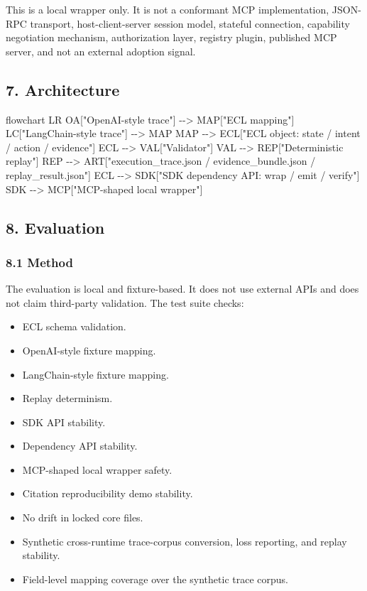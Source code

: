 \documentclass[
]{article}
\newenvironment{Shaded}{}{}
\newcommand{\NormalTok}[1]{#1}
\providecommand{\tightlist}{%
  \setlength{\itemsep}{0pt}\setlength{\parskip}{0pt}}
\begin{document}
This is a local wrapper only. It is not a conformant MCP implementation,
JSON-RPC transport, host-client-server session model, stateful
connection, capability negotiation mechanism, authorization layer,
registry plugin, published MCP server, and not an external adoption
signal.

\subsection{7. Architecture}\label{architecture}

\begin{Shaded}
\begin{Highlighting}[]
\NormalTok{flowchart LR}
\NormalTok{  OA["OpenAI{-}style trace"] {-}{-}\textgreater{} MAP["ECL mapping"]}
\NormalTok{  LC["LangChain{-}style trace"] {-}{-}\textgreater{} MAP}
\NormalTok{  MAP {-}{-}\textgreater{} ECL["ECL object: state / intent / action / evidence"]}
\NormalTok{  ECL {-}{-}\textgreater{} VAL["Validator"]}
\NormalTok{  VAL {-}{-}\textgreater{} REP["Deterministic replay"]}
\NormalTok{  REP {-}{-}\textgreater{} ART["execution\_trace.json / evidence\_bundle.json / replay\_result.json"]}
\NormalTok{  ECL {-}{-}\textgreater{} SDK["SDK dependency API: wrap / emit / verify"]}
\NormalTok{  SDK {-}{-}\textgreater{} MCP["MCP{-}shaped local wrapper"]}
\end{Highlighting}
\end{Shaded}

\subsection{8. Evaluation}\label{evaluation}

\subsubsection{8.1 Method}\label{method}

The evaluation is local and fixture-based. It does not use external APIs
and does not claim third-party validation. The test suite checks:

\begin{itemize}
\tightlist
\item
  ECL schema validation.
\item
  OpenAI-style fixture mapping.
\item
  LangChain-style fixture mapping.
\item
  Replay determinism.
\item
  SDK API stability.
\item
  Dependency API stability.
\item
  MCP-shaped local wrapper safety.
\item
  Citation reproducibility demo stability.
\item
  No drift in locked core files.
\item
  Synthetic cross-runtime trace-corpus conversion, loss reporting, and
  replay stability.
\item
  Field-level mapping coverage over the synthetic trace corpus.
\end{itemize}
\end{document}
